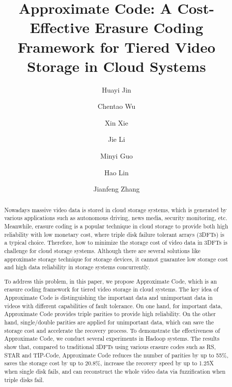 \documentclass[sigconf]{acmart}
\begin{document}
\title{Approximate Code: A Cost-Effective Erasure Coding Framework for Tiered Video Storage in Cloud Systems}

\author{Huayi Jin}

\author{Chentao Wu}
\author{Xin Xie}
\author{Jie Li}
\author{Minyi Guo}

\author{Hao Lin}
\author{Jianfeng Zhang}
\authornotemark[1]

\begin{abstract}
Nowadays massive video data is stored in cloud storage systems, which is generated by various applications such as autonomous driving, news media, security monitoring, etc. Meanwhile, erasure coding is a popular technique in cloud storage to provide both high reliability with low monetary cost, where triple disk failure tolerant arrays (3DFTs) is a typical choice. Therefore, how to minimize the storage cost of video data in 3DFTs is challenge for cloud storage systems. Although there are several solutions like approximate storage technique for storage devices, it cannot guarantee low storage cost and high data reliability in storage systems concurrently.

To address this problem, in this paper, we propose Approximate Code, which is an erasure coding framework for tiered video storage in cloud systems. The key idea of Approximate Code is distinguishing the important data and unimportant data in videos with different capabilities of fault tolerance. On one hand, for important data, Approximate Code provides triple parities to provide high reliability. On the other hand, single/double parities are applied for unimportant data, which can save the storage cost and accelerate the recovery process. To demonstrate the effectiveness of Approximate Code, we conduct several experiments in Hadoop systems. The results show that, compared to traditional 3DFTs using various erasure codes such as RS, STAR and TIP-Code, Approximate Code reduces the number of parities by up to 55\%, saves the storage cost by up to 20.8\%, increase the recovery speed by up to 1.25X when single disk fails, and can reconstruct the whole video data via fuzzification when triple disks fail.
\end{abstract}

\end{document}

